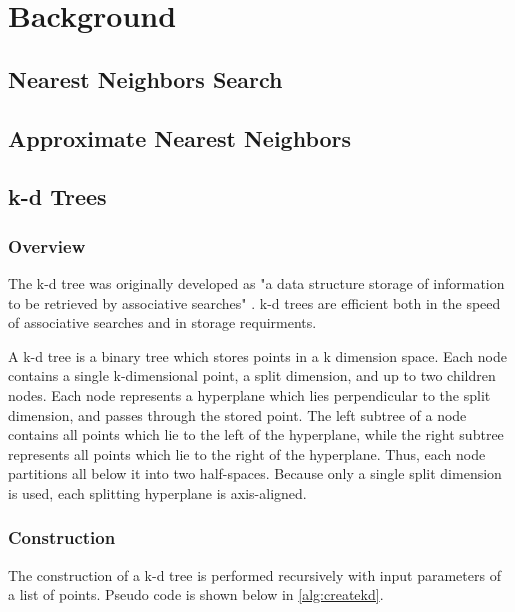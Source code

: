 \chapter{Background} %

\label{Background} %


\section{Nearest Neighbors Search}

\section{Approximate Nearest Neighbors}

\section{k-d Trees}

\subsection{Overview}
The k-d tree was originally developed as "a data structure storage of information to be retrieved by associative searches" \citep{bentley1975multidimensional}. k-d trees are efficient both in the speed of associative searches and in storage requirments.

A k-d tree is a binary tree which stores points in a k dimension space.  Each node contains a single k-dimensional point, a split dimension, and up to two children nodes.  Each node represents a hyperplane which lies perpendicular to the split dimension, and passes through the stored point.  The left subtree of a node contains all points which lie to the left of the hyperplane, while the right subtree represents all points which lie to the right of the hyperplane.  Thus, each node partitions all below it into two half-spaces.  Because only a single split dimension is used, each splitting hyperplane is axis-aligned.

\subsection{Construction}

The construction of a k-d tree is performed recursively with input parameters of a list of points.  Pseudo code is shown below in \ref{alg:createkd}.  

